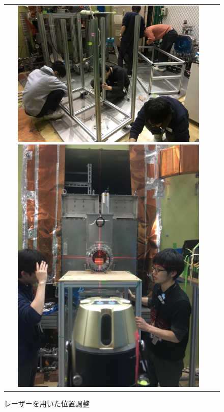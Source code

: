   \begin{figure}[H]
    \begin{tabular}{cc}
      \begin{minipage}{0.5\hsize}
        \centering
        \includegraphics[width=0.9\textwidth]{figure/hayakawa/kadai_setup.jpg}
        \caption{架台の組み立て}
        \end{minipage}
        \begin{minipage}{0.5\hsize}
        \centering
        \includegraphics[width=0.9\textwidth]{figure/hayakawa/laser1.jpg}
        \caption{レーザーを用いた位置調整}
      \end{minipage}
    \end{tabular}
  \end{figure}
  
